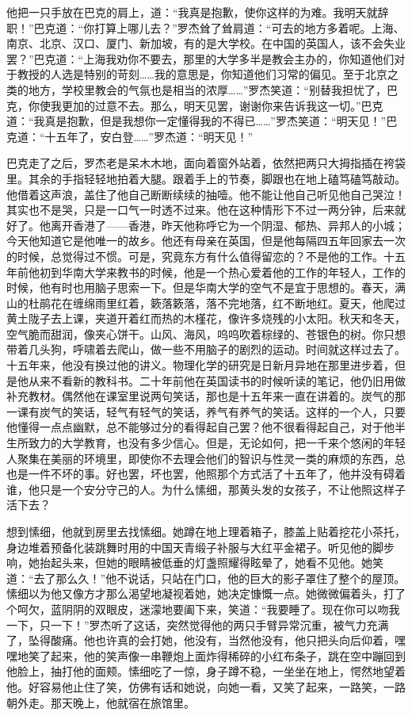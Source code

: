 \par 他把一只手放在巴克的肩上，道：“我真是抱歉，使你这样的为难。我明天就辞职！”巴克道：“你打算上哪儿去？”罗杰耸了耸肩道：“可去的地方多着呢。上海、南京、北京、汉口、厦门、新加坡，有的是大学校。在中国的英国人，该不会失业罢？”巴克道：“上海我劝你不要去，那里的大学多半是教会主办的，你知道他们对于教授的人选是特别的苛刻……我的意思是，你知道他们习常的偏见。至于北京之类的地方，学校里教会的气氛也是相当的浓厚……”罗杰笑道：“别替我担忧了，巴克，你使我更加的过意不去。那么，明天见罢，谢谢你来告诉我这一切。”巴克道：“我真是抱歉，但是我想你一定懂得我的不得已……”罗杰笑道：“明天见！”巴克道：“十五年了，安白登……”罗杰道：“明天见！”
\par 巴克走了之后，罗杰老是呆木木地，面向着窗外站着，依然把两只大拇指插在袴袋里。其余的手指轻轻地拍着大腿。跟着手上的节奏，脚跟也在地上磕笃磕笃敲动。他借着这声浪，盖住了他自己断断续续的抽噎。他不能让他自己听见他自己哭泣！其实也不是哭，只是一口气一时透不过来。他在这种情形下不过一两分钟，后来就好了。他离开香港了——香港，昨天他称呼它为一个阴湿、郁热、异邦人的小城；今天他知道它是他唯一的故乡。他还有母亲在英国，但是他每隔四五年回家去一次的时候，总觉得过不惯。可是，究竟东方有什么值得留恋的？不是他的工作。十五年前他初到华南大学来教书的时候，他是一个热心爱着他的工作的年轻人，工作的时候，他有时也用脑子思索一下。但是华南大学的空气不是宜于思想的。春天，满山的杜鹃花在缠绵雨里红着，簌落簌落，落不完地落，红不断地红。夏天，他爬过黄土陇子去上课，夹道开着红而热的木槿花，像许多烧残的小太阳。秋天和冬天，空气脆而甜润，像夹心饼干。山风、海风，呜呜吹着棕绿的、苍银色的树。你只想带着几头狗，呼啸着去爬山，做一些不用脑子的剧烈的运动。时间就这样过去了。十五年来，他没有换过他的讲义。物理化学的研究是日新月异地在那里进步着，但是他从来不看新的教科书。二十年前他在英国读书的时候听读的笔记，他仍旧用做补充教材。偶然他在课室里说两句笑话，那也是十五年来一直在讲着的。炭气的那一课有炭气的笑话，轻气有轻气的笑话，养气有养气的笑话。这样的一个人，只要他懂得一点点幽默，总不能够过分的看得起自己罢？他不很看得起自己，对于他半生所致力的大学教育，也没有多少信心。但是，无论如何，把一千来个悠闲的年轻人聚集在美丽的环境里，即使你不去理会他们的智识与性灵一类的麻烦的东西，总也是一件不坏的事。好也罢，坏也罢，他照那个方式活了十五年了，他并没有碍着谁，他只是一个安分守己的人。为什么愫细，那黄头发的女孩子，不让他照这样子活下去？
\par 想到愫细，他就到房里去找愫细。她蹲在地上理着箱子，膝盖上贴着挖花小茶托，身边堆着预备化装跳舞时用的中国天青缎子补服与大红平金裙子。听见他的脚步响，她抬起头来，但她的眼睛被低垂的灯盏照耀得眩晕了，她看不见他。她笑道：“去了那么久！”他不说话，只站在门口，他的巨大的影子罩住了整个的屋顶。愫细以为他又像方才那么渴望地凝视着她，她决定慷慨一点。她微微偏着头，打了个呵欠，蓝阴阴的双眼皮，迷濛地要阖下来，笑道：“我要睡了。现在你可以吻我一下，只一下！”罗杰听了这话，突然觉得他的两只手臂异常沉重，被气力充满了，坠得酸痛。他也许真的会打她，他没有，当然他没有，他只把头向后仰着，嘿嘿地笑了起来，他的笑声像一串鞭炮上面炸得稀碎的小红布条子，跳在空中蹦回到他脸上，抽打他的面颊。愫细吃了一惊，身子蹲不稳，一坐坐在地上，愕然地望着他。好容易他止住了笑，仿佛有话和她说，向她一看，又笑了起来，一路笑，一路朝外走。那天晚上，他就宿在旅馆里。
